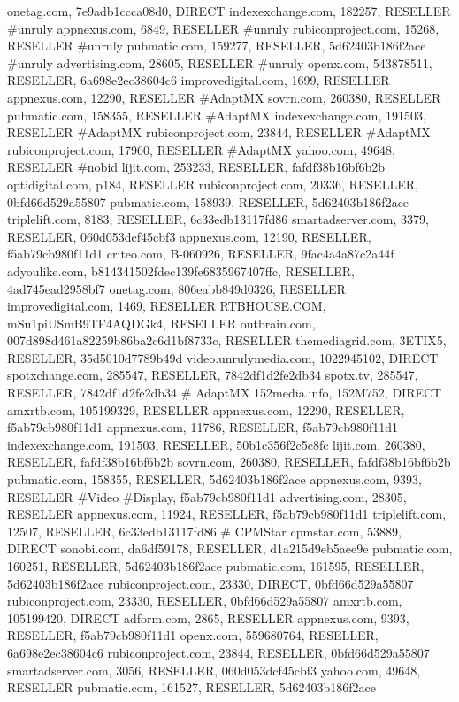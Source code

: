 onetag.com, 7e9adb1ccca08d0, DIRECT
indexexchange.com, 182257, RESELLER #unruly
appnexus.com, 6849, RESELLER #unruly
rubiconproject.com, 15268, RESELLER #unruly
pubmatic.com, 159277, RESELLER, 5d62403b186f2ace #unruly
advertising.com, 28605, RESELLER #unruly
openx.com, 543878511, RESELLER, 6a698e2ec38604c6
improvedigital.com, 1699, RESELLER
appnexus.com, 12290, RESELLER #AdaptMX
sovrn.com, 260380, RESELLER
pubmatic.com, 158355, RESELLER #AdaptMX
indexexchange.com, 191503, RESELLER #AdaptMX
rubiconproject.com, 23844, RESELLER #AdaptMX
rubiconproject.com, 17960, RESELLER #AdaptMX
yahoo.com, 49648, RESELLER #nobid
lijit.com, 253233, RESELLER, fafdf38b16bf6b2b
optidigital.com, p184, RESELLER
rubiconproject.com, 20336, RESELLER, 0bfd66d529a55807
pubmatic.com, 158939, RESELLER, 5d62403b186f2ace
triplelift.com, 8183, RESELLER, 6c33edb13117fd86
smartadserver.com, 3379, RESELLER, 060d053dcf45cbf3
appnexus.com, 12190, RESELLER, f5ab79cb980f11d1
criteo.com, B-060926, RESELLER, 9fac4a4a87c2a44f
adyoulike.com, b814341502fdec139fe6835967407ffc, RESELLER, 4ad745ead2958bf7
onetag.com, 806eabb849d0326, RESELLER
improvedigital.com, 1469, RESELLER
RTBHOUSE.COM, mSu1piUSmB9TF4AQDGk4, RESELLER
outbrain.com, 007d898d461a82259b86ba2c6d1bf8733c, RESELLER
themediagrid.com, 3ETIX5, RESELLER, 35d5010d7789b49d
video.unrulymedia.com, 1022945102, DIRECT
spotxchange.com, 285547, RESELLER, 7842df1d2fe2db34
spotx.tv, 285547, RESELLER, 7842df1d2fe2db34
# AdaptMX
152media.info, 152M752, DIRECT
amxrtb.com, 105199329, RESELLER
appnexus.com, 12290, RESELLER, f5ab79cb980f11d1
appnexus.com, 11786, RESELLER, f5ab79cb980f11d1
indexexchange.com, 191503, RESELLER, 50b1c356f2c5c8fc
lijit.com, 260380, RESELLER, fafdf38b16bf6b2b
sovrn.com, 260380, RESELLER, fafdf38b16bf6b2b
pubmatic.com, 158355, RESELLER, 5d62403b186f2ace
appnexus.com, 9393, RESELLER #Video #Display, f5ab79cb980f11d1
advertising.com, 28305, RESELLER
appnexus.com, 11924, RESELLER, f5ab79cb980f11d1
triplelift.com, 12507, RESELLER, 6c33edb13117fd86
# CPMStar
cpmstar.com, 53889, DIRECT
sonobi.com, da6df59178, RESELLER, d1a215d9eb5aee9e
pubmatic.com, 160251, RESELLER, 5d62403b186f2ace
pubmatic.com, 161595, RESELLER, 5d62403b186f2ace
rubiconproject.com, 23330, DIRECT, 0bfd66d529a55807
rubiconproject.com, 23330, RESELLER, 0bfd66d529a55807
amxrtb.com, 105199420, DIRECT
adform.com, 2865, RESELLER
appnexus.com, 9393, RESELLER, f5ab79cb980f11d1
openx.com, 559680764, RESELLER, 6a698e2ec38604c6
rubiconproject.com, 23844, RESELLER, 0bfd66d529a55807
smartadserver.com, 3056, RESELLER, 060d053dcf45cbf3
yahoo.com, 49648, RESELLER
pubmatic.com, 161527, RESELLER, 5d62403b186f2ace
